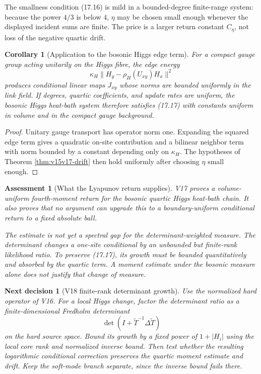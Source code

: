 \documentclass[11pt]{article}
\newtheorem{corollary}[theorem]{Corollary}
\newtheorem{decision}[theorem]{Next decision}
\newtheorem{assessment}[theorem]{Assessment}
\theoremstyle{remark}
\begin{document}
The smallness condition (17.16) is mild in a bounded-degree
finite-range system: because the power \(4/3\) is below \(4\),
\(\eta\) may be chosen small enough whenever the displayed incident
sums are finite.  The price is a larger return constant
\(C_\eta\), not loss of the negative quartic drift.

\begin{corollary}[Application to the bosonic Higgs edge term]
\label{cor:v15v17-higgs}
For a compact gauge group acting unitarily on the Higgs fibre, the
edge energy
\[
 \kappa_H\|H_y-\rho_H(U_{xy})H_x\|^2
\]
produces conditional linear maps \(J_{xy}\) whose norms are bounded
uniformly in the link field.  If degrees, quartic coefficients, and
update rates are uniform, the bosonic Higgs heat-bath system
therefore satisfies (17.17) with constants uniform in volume and
in the compact gauge background.
\end{corollary}

\begin{proof}
Unitary gauge transport has operator norm one.  Expanding the
squared edge term gives a quadratic on-site contribution and a
bilinear neighbor term with norm bounded by a constant depending
only on \(\kappa_H\).  The hypotheses of Theorem
\ref{thm:v15v17-drift} then hold uniformly after choosing
\(\eta\) small enough.
\end{proof}

\begin{assessment}[What the Lyapunov return supplies]
\label{ass:v15v17-reading}
V17 proves a volume-uniform fourth-moment return for the bosonic
quartic Higgs heat-bath chain.  It also proves that no argument can
upgrade this to a boundary-uniform conditional return to a fixed
absolute ball.

The estimate is not yet a spectral gap for the determinant-weighted
measure.  The determinant changes a one-site conditional by an
unbounded but finite-rank likelihood ratio.  To preserve
(17.17), its growth must be bounded quantitatively and absorbed by
the quartic term.  A moment estimate under the bosonic measure alone
does not justify that change of measure.
\end{assessment}

\begin{decision}[V18 finite-rank determinant growth]
\label{dec:v15v17-next}
Use the normalized hard operator of V16.  For a local Higgs change,
factor the determinant ratio as a finite-dimensional Fredholm
determinant
\[
 \det(I+\widetilde T^{-1}\Delta\widetilde T)
\]
on the hard source space.  Bound its growth by a fixed power of
\(1+|H_i|\) using the local core rank and normalized inverse bound.
Then test whether the resulting logarithmic conditional correction
preserves the quartic moment estimate and drift.  Keep the
soft-mode branch separate, since the inverse bound fails there.
\end{decision}
\end{document}
